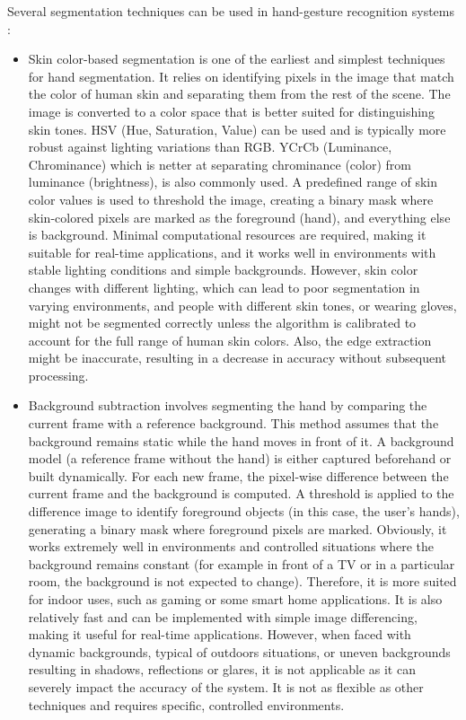 \documentclass[12pt]{article}
\begin{document}
Several segmentation techniques can be used in hand-gesture recognition systems :
\begin{itemize}
  \item Skin color-based segmentation is one of the earliest and simplest techniques for hand segmentation. It relies on identifying pixels in the image that match the color of human skin and separating them from the rest of the scene. The image is converted to a color space that is better suited for distinguishing skin tones. HSV (Hue, Saturation, Value) can be used and is typically more robust against lighting variations than RGB. YCrCb (Luminance, Chrominance) which is netter at separating chrominance (color) from luminance (brightness), is also commonly used. A predefined range of skin color values is used to threshold the image, creating a binary mask where skin-colored pixels are marked as the foreground (hand), and everything else is background. Minimal computational resources are required, making it suitable for real-time applications, and it works well in environments with stable lighting conditions and simple backgrounds. However, skin color changes with different lighting, which can lead to poor segmentation in varying environments, and people with different skin tones, or wearing gloves, might not be segmented correctly unless the algorithm is calibrated to account for the full range of human skin colors. Also, the edge extraction might be inaccurate, resulting in a decrease in accuracy without subsequent processing.
  \item Background subtraction involves segmenting the hand by comparing the current frame with a reference background. This method assumes that the background remains static while the hand moves in front of it. A background model (a reference frame without the hand) is either captured beforehand or built dynamically. For each new frame, the pixel-wise difference between the current frame and the background is computed. A threshold is applied to the difference image to identify foreground objects (in this case, the user's hands), generating a binary mask where foreground pixels are marked. Obviously, it works extremely well in environments and controlled situations where the background remains constant (for example in front of a TV or in a particular room, the background is not expected to change). Therefore, it is more suited for indoor uses, such as gaming or some smart home applications. It is also relatively fast and can be implemented with simple image differencing, making it useful for real-time applications. However, when faced with dynamic backgrounds, typical of outdoors situations, or uneven backgrounds resulting in shadows, reflections or glares, it is not applicable as it can severely impact the accuracy of the system. It is not as flexible as other techniques and requires specific, controlled environments.

\end{itemize}
\end{document}
